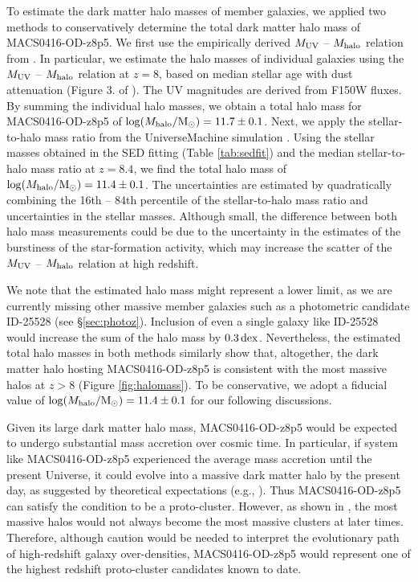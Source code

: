 \documentclass[twocolumn]{aastex631}
\begin{document}
To estimate the dark matter halo masses of member galaxies, we applied two methods to conservatively determine the total dark matter halo mass of MACS0416-OD-z8p5.
We first use the empirically derived $M_{\rm UV}$ -- $M_{\rm halo}$ relation from \citet{Mason2023}.
In particular, we estimate the halo masses of individual galaxies using the $M_{\rm UV}$ -- $M_{\rm halo}$ relation at $z=8$, based on median stellar age with dust attenuation (Figure 3. of \citealt{Mason2023}). The UV magnitudes are derived from F150W fluxes.
By summing the individual halo masses, we obtain a total halo mass for MACS0416-OD-z8p5 of ${\rm log}(M_{\rm halo}/{\rm M_{\odot}})=11.7\pm{0.1}$.
Next, we apply the stellar-to-halo mass ratio from the UniverseMachine simulation \citep{Behroozi2019}. Using the stellar masses obtained in the SED fitting (Table \ref{tab:sedfit}) and the median stellar-to-halo mass ratio at $z=8.4$, we find the total halo mass of ${\rm log}(M_{\rm halo}/{\rm M_{\odot}})=11.4\pm0.1$. 
The uncertainties are estimated by quadratically combining the 16th -- 84th percentile of the stellar-to-halo mass ratio and uncertainties in the stellar masses.
Although small, the difference between both halo mass measurements could be due to the uncertainty in the estimates of  the burstiness of the star-formation activity, which may increase the scatter of the $M_{\rm UV}$ -- $M_{\rm halo}$ relation at high redshift.


We note that the estimated halo mass might represent a lower limit, as we are currently missing other massive member galaxies such as a photometric candidate ID-25528 (see \S\ref{sec:photoz}). Inclusion of even a single galaxy like ID-25528 would increase the sum of the halo mass by $0.3\,{\rm dex}$.
Nevertheless, the estimated total halo masses in both methods similarly show that, altogether, the dark matter halo hosting MACS0416-OD-z8p5 is consistent with the most massive halos at $z>8$ (Figure \ref{fig:halomass}).
To be conservative, we adopt a fiducial value of ${\rm log}(M_{\rm halo}/{\rm M_{\odot}})=11.4\pm0.1$ for our following discussions.

Given its large dark matter halo mass, MACS0416-OD-z8p5 would be expected to undergo substantial mass accretion over cosmic time.
In particular, if system like MACS0416-OD-z8p5 experienced the average mass accretion until the present Universe, it could evolve into a massive dark matter halo by the present day, as suggested by theoretical expectations (e.g.,  \citealt{Behroozi2013,Behroozi2019,Chiang2013}).  Thus MACS0416-OD-z8p5 can satisfy the condition to be a proto-cluster. 
However, as shown in \citealt{Angulo2012}, the most massive halos would not always become the most massive clusters at later times.
Therefore, although caution would be needed to interpret the evolutionary path of high-redshift galaxy over-densities, MACS0416-OD-z8p5 would represent one of the highest redshift proto-cluster candidates known to date.
\end{document}
